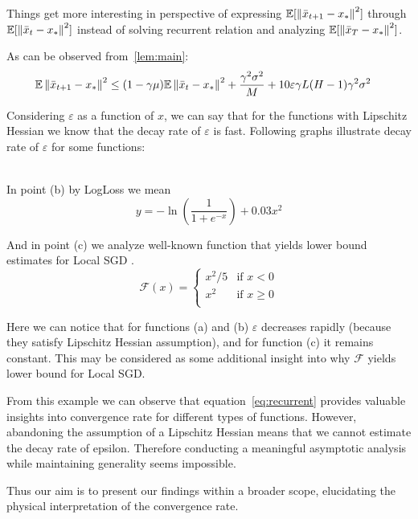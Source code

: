 Things get more interesting in perspective of expressing $\mathbb{E}[\left\|\bar{x}_{t+1} - x_*\right\|^2]$ through $\mathbb{E}[\left\|\bar{x}_{t} - x_*\right\|^2]$ instead of solving recurrent relation and analyzing $\mathbb{E}[\left\|\bar{x}_T - x_*\right\|^2]$. 


As can be observed from~\ref{lem:main}:
\begin{align}
     \mathbb{E} \left\|\bar{x}_{t+1}-x_*\right\|^2
    &\leq
    (1 - \gamma \mu) \mathbb{E} \left\|\bar{x}_t - x_*\right\|^2 
    + \frac{\gamma^2 \sigma^2}{M}
    + 10 \varepsilon \gamma L (H-1) \gamma^2 \sigma^2 \label{eq:recurrent}
\end{align}

Considering $\varepsilon$ as a function of $x$, we can say that for the functions with Lipschitz Hessian we know that the decay rate of $\varepsilon$ is fast. Following graphs illustrate decay rate of $\varepsilon$ for some functions:


\\

In point (b) by LogLoss we mean 
\begin{equation} \label{eq:logloss}
    y = -\ln\left(\frac{1}{1 + e^{-x}} \right) + 0.03 {x^2}
\end{equation}

And in point (c) we analyze well-known function that yields lower bound estimates for Local SGD \citep{LowerBound}.
\begin{equation} \label{eq:piecewise}
    \mathcal{F}(x) = \begin{cases} 
      x^2 / 5 & \text{if } x < 0 \\
      x^2 & \text{if } x \geq 0 \\
   \end{cases}
\end{equation}

Here we can notice that for functions (a) and (b) $\varepsilon$ decreases rapidly (because they satisfy Lipschitz Hessian assumption), and for function (c) it remains constant. This may be considered as some additional insight into why 
$\mathcal{F}$ yields lower bound for Local SGD.

From this example we can observe that equation~\ref{eq:recurrent} provides valuable insights into convergence rate for different types of functions. However, abandoning the assumption of a Lipschitz Hessian means that we cannot estimate the decay rate of epsilon. Therefore conducting a meaningful asymptotic analysis while maintaining generality seems impossible.

Thus our aim is to present our findings within a broader scope, elucidating the physical interpretation of the convergence rate.
